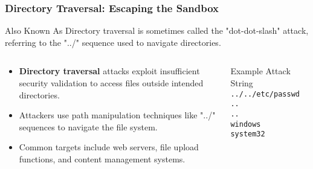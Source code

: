\documentclass{beamer}
\begin{document}
\begin{frame}
    \frametitle{Directory Traversal: Escaping the Sandbox}
    
    \begin{alertblock}{Also Known As}
        Directory traversal is sometimes called the "dot-dot-slash" attack, referring to the "../" sequence used to navigate directories.
    \end{alertblock}
    
    \begin{columns}
        \begin{column}{0.6\textwidth}
            \begin{itemize}
                \item \textbf{Directory traversal} attacks exploit insufficient security validation to access files outside intended directories.
                \item Attackers use path manipulation techniques like "../" sequences to navigate the file system.
                \item Common targets include web servers, file upload functions, and content management systems.
            \end{itemize}
        \end{column}
        \begin{column}{0.4\textwidth}
            \begin{block}{Example Attack String}
                \texttt{../../etc/passwd}\\
                \texttt{..\\..\\windows\\system32\\}
            \end{block}
        \end{column}
    \end{columns}
    
\end{frame}
\end{document}
